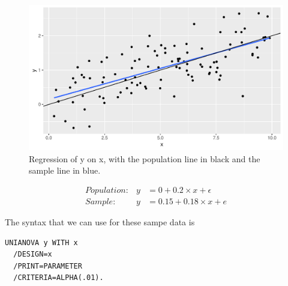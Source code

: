 \documentclass[]{report}\usepackage[]{graphicx}\usepackage[]{color}
\makeatletter
\def\maxwidth{ %
  \ifdim\Gin@nat@width>\linewidth
    \linewidth
  \else
    \Gin@nat@width
  \fi
}
\newenvironment{knitrout}{}{} %
\makeatother
\begin{document}
\begin{knitrout}
\color{fgcolor}\begin{figure}

{\centering \includegraphics[width=\maxwidth]{figure/inf_28-1} 

}

\caption[Regression of y on x, with the population line in black and the sample line in blue]{Regression of y on x, with the population line in black and the sample line in blue.}\label{fig:inf_28}
\end{figure}


\end{knitrout}

\begin{eqnarray}
Population: &y&= 0 + 0.2 \times x + \epsilon\\
Sample: &y&= 0.15 + 0.18\times x + e
\end{eqnarray}

The syntax that we can use for these sampe data is

\begin{verbatim}
UNIANOVA y WITH x
  /DESIGN=x
  /PRINT=PARAMETER
  /CRITERIA=ALPHA(.01).
\end{verbatim}
\end{document}
